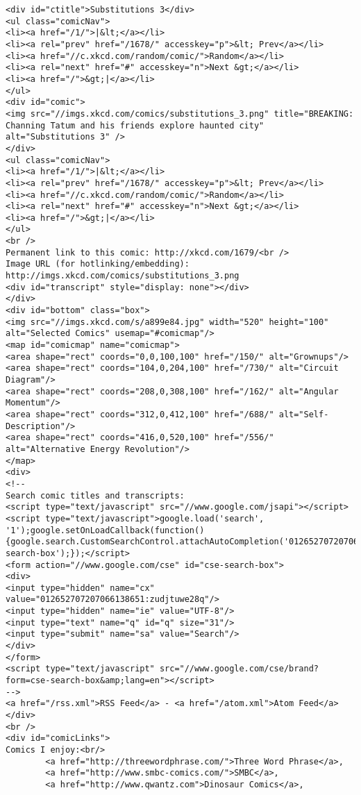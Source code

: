 \begin{lstlisting}
<div id="ctitle">Substitutions 3</div>
<ul class="comicNav">
<li><a href="/1/">|&lt;</a></li>
<li><a rel="prev" href="/1678/" accesskey="p">&lt; Prev</a></li>
<li><a href="//c.xkcd.com/random/comic/">Random</a></li>
<li><a rel="next" href="#" accesskey="n">Next &gt;</a></li>
<li><a href="/">&gt;|</a></li>
</ul>
<div id="comic">
<img src="//imgs.xkcd.com/comics/substitutions_3.png" title="BREAKING: Channing Tatum and his friends explore haunted city" alt="Substitutions 3" />
</div>
<ul class="comicNav">
<li><a href="/1/">|&lt;</a></li>
<li><a rel="prev" href="/1678/" accesskey="p">&lt; Prev</a></li>
<li><a href="//c.xkcd.com/random/comic/">Random</a></li>
<li><a rel="next" href="#" accesskey="n">Next &gt;</a></li>
<li><a href="/">&gt;|</a></li>
</ul>
<br />
Permanent link to this comic: http://xkcd.com/1679/<br />
Image URL (for hotlinking/embedding): http://imgs.xkcd.com/comics/substitutions_3.png
<div id="transcript" style="display: none"></div>
</div>
<div id="bottom" class="box">
<img src="//imgs.xkcd.com/s/a899e84.jpg" width="520" height="100" alt="Selected Comics" usemap="#comicmap"/>
<map id="comicmap" name="comicmap">
<area shape="rect" coords="0,0,100,100" href="/150/" alt="Grownups"/>
<area shape="rect" coords="104,0,204,100" href="/730/" alt="Circuit Diagram"/>
<area shape="rect" coords="208,0,308,100" href="/162/" alt="Angular Momentum"/>
<area shape="rect" coords="312,0,412,100" href="/688/" alt="Self-Description"/>
<area shape="rect" coords="416,0,520,100" href="/556/" alt="Alternative Energy Revolution"/>
</map>
<div>
<!--
Search comic titles and transcripts:
<script type="text/javascript" src="//www.google.com/jsapi"></script>
<script type="text/javascript">google.load('search', '1');google.setOnLoadCallback(function() {google.search.CustomSearchControl.attachAutoCompletion('012652707207066138651:zudjtuwe28q',document.getElementById('q'),'cse-search-box');});</script>
<form action="//www.google.com/cse" id="cse-search-box">
<div>
<input type="hidden" name="cx" value="012652707207066138651:zudjtuwe28q"/>
<input type="hidden" name="ie" value="UTF-8"/>
<input type="text" name="q" id="q" size="31"/>
<input type="submit" name="sa" value="Search"/>
</div>
</form>
<script type="text/javascript" src="//www.google.com/cse/brand?form=cse-search-box&amp;lang=en"></script>
-->
<a href="/rss.xml">RSS Feed</a> - <a href="/atom.xml">Atom Feed</a>
</div>
<br />
<div id="comicLinks">
Comics I enjoy:<br/>
        <a href="http://threewordphrase.com/">Three Word Phrase</a>,
        <a href="http://www.smbc-comics.com/">SMBC</a>,
        <a href="http://www.qwantz.com">Dinosaur Comics</a>,

\end{lstlisting}
